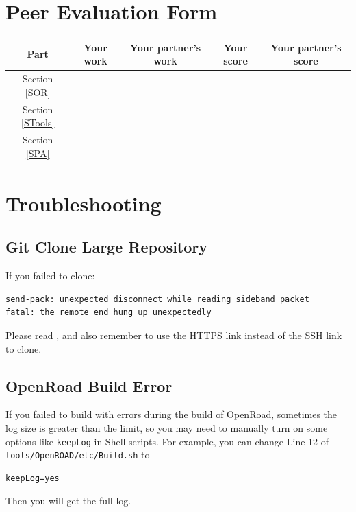 \documentclass[a4paper,12pt,twoside]{article}
\begin{document}
\newpage
\appendix
\section{Peer Evaluation Form}
\begin{table}[H]
    \centering
    \begin{tabular}{|c|c|c|c|c|}
        \hline
        Part & Your work & Your partner's work & Your score & Your partner's score \\
        \hline
        Section \ref{SOR} & & & & \\
        \hline
        Section \ref{STools} & & & & \\
        \hline
        Section \ref{SPA} & & & & \\
        \hline
    \end{tabular}
\end{table}
\section{Troubleshooting}
\subsection{Git Clone Large Repository}\label{ATGit}
If you failed to clone:
\begin{verbatim}
send-pack: unexpected disconnect while reading sideband packet
fatal: the remote end hung up unexpectedly
\end{verbatim}
Please read \cite{gitclone}, and also remember to use the HTTPS link instead of the SSH link to clone.
\subsection{OpenRoad Build Error}\label{ATBuild}
If you failed to build with errors during the build of OpenRoad, sometimes the log size is greater than the limit, so you may need to manually turn on some options like \texttt{keepLog} in Shell scripts. For example, you can change Line 12 of \texttt{tools/OpenROAD/etc/Build.sh} to
\begin{verbatim}
keepLog=yes
\end{verbatim}
Then you will get the full log.
\end{document}
